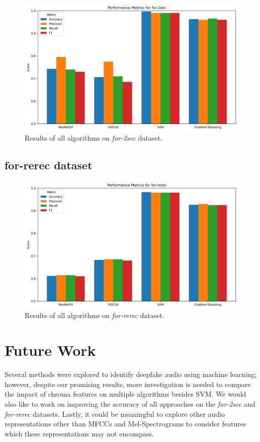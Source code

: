 \documentclass[conference]{IEEEtran}
\begin{document}
\begin{figure}
  \centering
  \includegraphics[width=\linewidth]{images/performance_metrics_for-2sec.csv.png}
  \caption{Results of all algorithms on \textit{for-2sec} dataset.}
  \label{fig:performance_metrics_for-2sec}
\end{figure}

\subsection{for-rerec dataset}

\begin{figure}
  \centering
  \includegraphics[width=\linewidth]{images/performance_metrics_for-rerec.csv.png}
  \caption{Results of all algorithms on \textit{for-rerec} dataset.}
  \label{fig:performance_metrics_for-rerec}
\end{figure}

\section{Future Work}
Several methods were explored to identify deepfake audio using machine learning; however, despite our promising results, more investigation is needed to compare the impact of chroma features on multiple algorithms besides SVM. We would also like to work on improving the accuracy of all approaches on the \textit{for-2sec} and \textit{for-rerec} datasets. Lastly, it could be meaningful to explore other audio representations other than MFCCs and Mel-Spectrograms to consider features which these representations may not encompass. 
\end{document}
